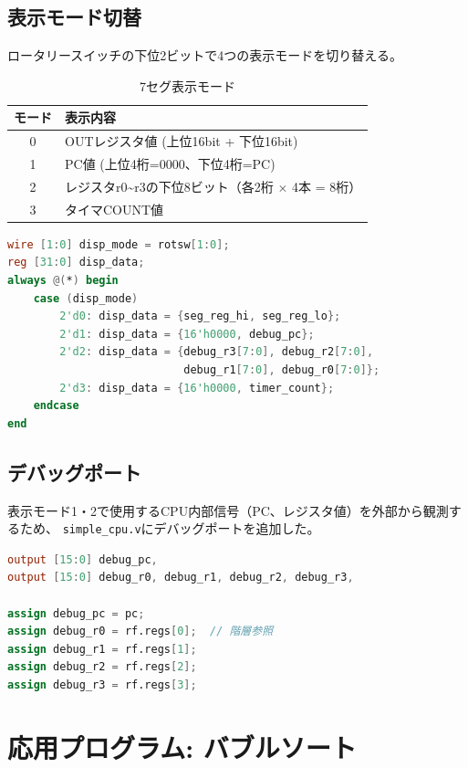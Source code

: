 \documentclass[a4paper,11pt]{ltjsarticle}
\begin{document}
\subsection{表示モード切替}

ロータリースイッチの下位2ビットで4つの表示モードを切り替える。

\begin{table}[h]
\centering
\caption{7セグ表示モード}
\begin{tabular}{cl}
\toprule
モード & 表示内容 \\
\midrule
0 & OUTレジスタ値 (上位16bit + 下位16bit) \\
1 & PC値 (上位4桁=0000、下位4桁=PC) \\
2 & レジスタr0\textasciitilde r3の下位8ビット（各2桁 $\times$ 4本 = 8桁） \\
3 & タイマCOUNT値 \\
\bottomrule
\end{tabular}
\end{table}

\begin{lstlisting}[language=Verilog,caption={表示データ選択}]
wire [1:0] disp_mode = rotsw[1:0];
reg [31:0] disp_data;
always @(*) begin
    case (disp_mode)
        2'd0: disp_data = {seg_reg_hi, seg_reg_lo};
        2'd1: disp_data = {16'h0000, debug_pc};
        2'd2: disp_data = {debug_r3[7:0], debug_r2[7:0],
                           debug_r1[7:0], debug_r0[7:0]};
        2'd3: disp_data = {16'h0000, timer_count};
    endcase
end
\end{lstlisting}

\subsection{デバッグポート}

表示モード1・2で使用するCPU内部信号（PC、レジスタ値）を外部から観測するため、
\texttt{simple\_cpu.v}にデバッグポートを追加した。

\begin{lstlisting}[language=Verilog,caption={デバッグポートの実装}]
output [15:0] debug_pc,
output [15:0] debug_r0, debug_r1, debug_r2, debug_r3,

assign debug_pc = pc;
assign debug_r0 = rf.regs[0];  // 階層参照
assign debug_r1 = rf.regs[1];
assign debug_r2 = rf.regs[2];
assign debug_r3 = rf.regs[3];
\end{lstlisting}


\section{応用プログラム: バブルソート}
\end{document}
